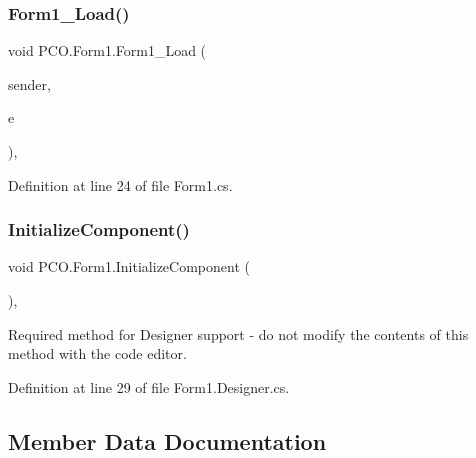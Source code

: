 \mbox{\label{classPCO_1_1Form1_ad4c812616130432ba0913f197bd464e1}} 
\subsubsection{\texorpdfstring{Form1\+\_\+\+Load()}{Form1\_Load()}}
{\footnotesize\ttfamily void P\+C\+O.\+Form1.\+Form1\+\_\+\+Load (\begin{DoxyParamCaption}\item[{object}]{sender,  }\item[{Event\+Args}]{e }\end{DoxyParamCaption})\hspace{0.3cm}{\ttfamily [inline]}, {\ttfamily [private]}}



Definition at line 24 of file Form1.\+cs.

\mbox{\label{classPCO_1_1Form1_a5c74d72f7112b3c6eabcae4edd7ef575}} 
\subsubsection{\texorpdfstring{Initialize\+Component()}{InitializeComponent()}}
{\footnotesize\ttfamily void P\+C\+O.\+Form1.\+Initialize\+Component (\begin{DoxyParamCaption}{ }\end{DoxyParamCaption})\hspace{0.3cm}{\ttfamily [inline]}, {\ttfamily [private]}}



Required method for Designer support -\/ do not modify the contents of this method with the code editor. 



Definition at line 29 of file Form1.\+Designer.\+cs.



\subsection{Member Data Documentation}
\mbox{\label{classPCO_1_1Form1_a8ea6e906a7b8a9ff5374e57bd6570c28}} 
